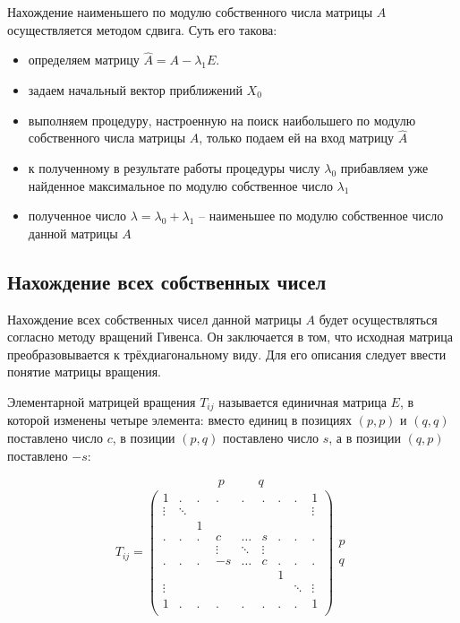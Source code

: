 \documentclass[12pt,a4paper]{article}
\begin{document}
Нахождение наименьшего по модулю собственного числа матрицы $A$ осуществляется методом сдвига. Суть его такова:
\begin{itemize}
\item определяем матрицу $\hat A = A-\lambda_1 E$.
\item задаем начальный вектор приближений $X_0$
\item выполняем процедуру, настроенную на поиск наибольшего по модулю собственного числа матрицы $A$, только подаем ей на вход матрицу $\hat A$
\item к полученному в результате работы процедуры числу $\lambda_0$ прибавляем уже найденное максимальное по модулю собственное число $\lambda_1$
\item полученное число $\lambda = \lambda_0 + \lambda_1$ -- наименьшее по модулю собственное число данной матрицы $A$
\end{itemize}

\subsection{Нахождение всех собственных чисел}

Нахождение всех собственных чисел данной матрицы $A$ будет осуществляться согласно методу вращений Гивенса. Он заключается в том, что исходная матрица преобразовывается к трёхдиагональному виду. Для его описания следует ввести понятие матрицы вращения.

Элементарной матрицей вращения $T_{ij}$ называется единичная матрица $E$, в которой изменены четыре элемента: вместо единиц в позициях $(p,p)$ и $(q,q)$ поставлено число $c$, в позиции $(p,q)$ поставлено число $s$, а в позиции $(q,p)$ поставлено $-s$:

$$
 \begin{array}{ccccccccc}
 \ & \ & \ \ \ \ & p & \ \ \ \ \ & q & & & 
 \end{array}
$$ 
$$
 T_{ij} =
 \left ( 
  \begin{array}{ccccccccc}	
   1 & . & . & . & . & . & . & . & 1 \\
   \vdots & \ddots & & & & & & & \vdots \\
   & & 1  \ \\
   . & . & . & c & \ldots & s & . & . & . \\
   & & & \vdots & \ddots & \vdots & & & \\
   . & . & . & -s & \ldots & c & . & . & . \\
    &  &  &  &  &  & 1 &  &  \\
   \vdots & & & & & & & \ddots & \vdots \\
   1 & . & . & . & . & . & . & . & 1 \\
  \end{array}   
 \right ) 
 \begin{array}{c}
  \\
  \\
  \\
  p \\
  \\
  q \\
  \\
  \\
  \ 
 \end{array}
$$
\end{document}
